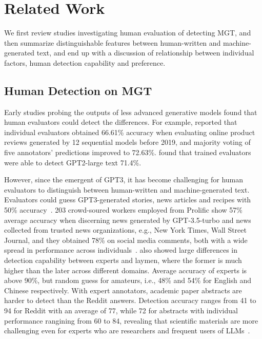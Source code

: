 \section{Related Work}
\label{sec:relatedwork}
We first review studies investigating human evaluation of detecting MGT, and then summarize distinguishable features between human-written and machine-generated text, and end up with a discussion of relationship between individual factors, human detection capability and preference.

\subsection{Human Detection on MGT}
\label{sec:human-eval-MGT}
Early studies probing the outputs of less advanced generative models found that human evaluators could detect the differences.
For example, \citet{garbacea-etal-2019-judge} reported that individual evaluators obtained 66.61\% accuracy when evaluating online product reviews generated by 12 sequential models before 2019, and majority voting of five annotators' predictions improved to 72.63\%. \citet{ippolito-etal-2020-automatic} found that trained evaluators were able to detect GPT2-large text 71.4\%.

However, since the emergent of GPT3, it has become challenging for human evaluators to distinguish between human-written and machine-generated text. Evaluators could guess GPT3-generated stories, news articles and recipes with 50\% accuracy~\citep{clark-etal-2021-thats}. 203 crowd-soured workers employed from Prolific show 57\% average accuracy when discerning news generated by GPT-3.5-turbo and news collected from trusted news organizations, e.g., New York Times, Wall Street Journal, and they obtained 78\% on social media comments, both with a wide spread in performance across individuals~\citep{chein2024human}.
\citet{guo-etal-2023-hc3} also showed large differences in detection capability between experts and laymen, where the former is much higher than the later across different domains. Average accuracy of experts is above 90\%, but random guess for amateurs, i.e., 48\% and 54\% for English and Chinese respectively. With expert annotators, academic paper abstracts are harder to detect than the Reddit answers.
Detection accuracy ranges from 41 to 94 for Reddit with an average of 77, while 72 for abstracts with individual performance rangining from 60 to 84, revealing that scientific materials are more challenging even for experts who are researchers and frequent users of LLMs~\cite{wang-etal-2024-m4}.

